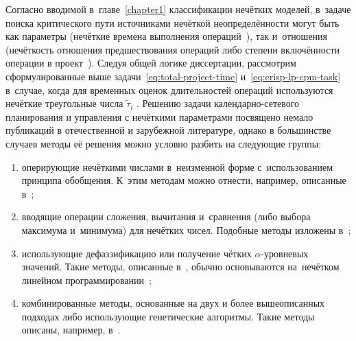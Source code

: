 Согласно вводимой в~главе~\ref{chapter1} классификации нечётких моделей, в~задаче поиска критического пути источниками нечёткой неопределённости могут быть как параметры (нечёткие времена выполнения операций~\cite{Elizabeth_FCPM}), так и~отношения (нечёткость отношения предшествования операций либо степени включённости операции в проект~\cite{Iran_Morovatdar}). Следуя общей логике диссертации, рассмотрим сформулированные выше задачи~\eqref{eq:total-project-time} и~\eqref{eq:crisp-lp-cpm-task} в~случае, когда для временных оценок длительностей операций используются нечёткие треугольные числа $\tilde \tau_i$ . Решению задачи календарно-сетевого планирования и управления с нечёткими параметрами посвящено немало публикаций в отечественной и зарубежной литературе, однако в большинстве случаев методы её решения можно условно разбить на следующие группы:

\begin{enumerate}
  \item оперирующие нечёткими числами в~неизменной форме с~использованием принципа обобщения. К~этим методам можно отнести, например, описанные в~\cite{Balashov_IPU, Chanas_Zielinski_Criticality, Chanas_Zielinski_FCPM, Barkalov, Fedorova_FCPM_IPU};
  \item вводящие операции сложения, вычитания и~сравнения (либо выбора максимума и~минимума) для нечётких чисел. Подобные методы изложены в~\cite{Uskov_FCPM, Leondes, Dubois_Prade, Iran_Railways, McCahon_Lee, Pavlov_Sokolov, Zak};
  \item использующие дефаззификацию или получение чётких $\alpha$-уровневых значений. Такие методы, описанные в~\cite{Egyptians, Indians_FCPM, Chinese_CPM, Kumar_Optimal_FCPM}, обычно основываются на~нечётком линейном программировании~\cite{Zak};
  \item комбинированные методы, основанные на двух и более вышеописанных подходах либо использующие генетические алгоритмы. Такие методы описаны, например, в~\cite{Liang_Han_FCPM, PhD_Starodubtsev, MEI-1, Liu_Fuzzy_Programming}.
\end{enumerate}

